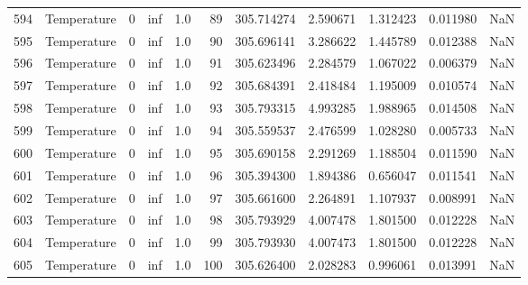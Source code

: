 \begin{tabular}{llrrrrrrrrr}
594 &  Temperature &       0 &  inf &  1.0 &   89 &  305.714274 &  2.590671 &  1.312423 &   0.011980 &      NaN \\
595 &  Temperature &       0 &  inf &  1.0 &   90 &  305.696141 &  3.286622 &  1.445789 &   0.012388 &      NaN \\
596 &  Temperature &       0 &  inf &  1.0 &   91 &  305.623496 &  2.284579 &  1.067022 &   0.006379 &      NaN \\
597 &  Temperature &       0 &  inf &  1.0 &   92 &  305.684391 &  2.418484 &  1.195009 &   0.010574 &      NaN \\
598 &  Temperature &       0 &  inf &  1.0 &   93 &  305.793315 &  4.993285 &  1.988965 &   0.014508 &      NaN \\
599 &  Temperature &       0 &  inf &  1.0 &   94 &  305.559537 &  2.476599 &  1.028280 &   0.005733 &      NaN \\
600 &  Temperature &       0 &  inf &  1.0 &   95 &  305.690158 &  2.291269 &  1.188504 &   0.011590 &      NaN \\
601 &  Temperature &       0 &  inf &  1.0 &   96 &  305.394300 &  1.894386 &  0.656047 &   0.011541 &      NaN \\
602 &  Temperature &       0 &  inf &  1.0 &   97 &  305.661600 &  2.264891 &  1.107937 &   0.008991 &      NaN \\
603 &  Temperature &       0 &  inf &  1.0 &   98 &  305.793929 &  4.007478 &  1.801500 &   0.012228 &      NaN \\
604 &  Temperature &       0 &  inf &  1.0 &   99 &  305.793930 &  4.007473 &  1.801500 &   0.012228 &      NaN \\
605 &  Temperature &       0 &  inf &  1.0 &  100 &  305.626400 &  2.028283 &  0.996061 &   0.013991 &      NaN \\
\bottomrule
\end{tabular}

